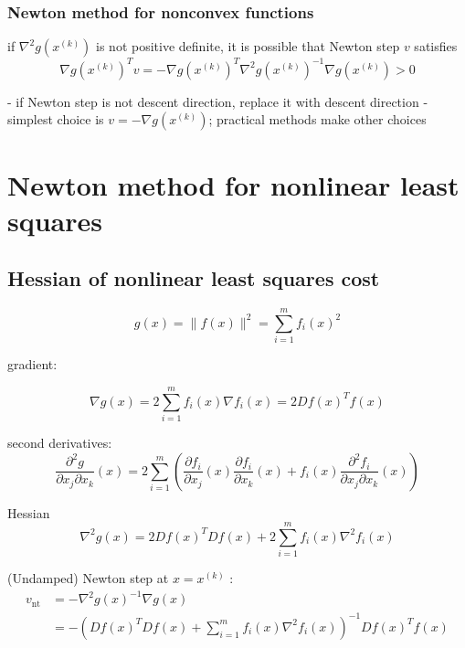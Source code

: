 \subsubsection{Newton method for nonconvex functions}

if $ \nabla^{2} g\left(x^{(k)}\right) $ is not positive definite, it is possible that Newton step $ v $ satisfies
$$
\nabla g\left(x^{(k)}\right)^{T} v=-\nabla g\left(x^{(k)}\right)^{T} \nabla^{2} g\left(x^{(k)}\right)^{-1} \nabla g\left(x^{(k)}\right)>0
$$


- if Newton step is not descent direction, replace it with descent direction
- simplest choice is $ v=-\nabla g\left(x^{(k)}\right) $; practical methods make other choices

\section{Newton method for nonlinear least squares}

\subsection{Hessian of nonlinear least squares cost}

$$
g(x)=\|f(x)\|^{2}=\sum_{i=1}^{m} f_{i}(x)^{2}
$$

\begin{theorem}
   gradient:

$$
\nabla g(x)=2 \sum_{i=1}^{m} f_{i}(x) \nabla f_{i}(x)=2 D f(x)^{T} f(x)
$$ 
\end{theorem}

\begin{theorem}
    second derivatives:
$$
\frac{\partial^{2} g}{\partial x_{j} \partial x_{k}}(x)=2 \sum_{i=1}^{m}\left(\frac{\partial f_{i}}{\partial x_{j}}(x) \frac{\partial f_{i}}{\partial x_{k}}(x)+f_{i}(x) \frac{\partial^{2} f_{i}}{\partial x_{j} \partial x_{k}}(x)\right)
$$
\end{theorem}

\begin{theorem}
    Hessian
$$
\nabla^{2} g(x)=2 D f(x)^{T} D f(x)+2 \sum_{i=1}^{m} f_{i}(x) \nabla^{2} f_{i}(x)
$$
\end{theorem}

\begin{theorem}
    (Undamped) Newton step at $ x=x^{(k)} $ :
$$
\begin{aligned}
v_{\mathrm{nt}} &=-\nabla^{2} g(x)^{-1} \nabla g(x) \\
&=-\left(D f(x)^{T} D f(x)+\sum_{i=1}^{m} f_{i}(x) \nabla^{2} f_{i}(x)\right)^{-1} D f(x)^{T} f(x)
\end{aligned}
$$

\end{theorem}

